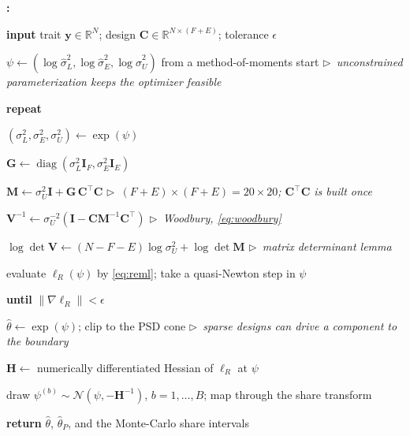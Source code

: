 \documentclass{ieeeaccess}
\theoremstyle{definition}
\theoremstyle{plain}
\newcounter{algstep}
\newenvironment{algsteps}{%
  \footnotesize
  \setcounter{algstep}{0}%
  \begin{list}{\textbf{\thealgstep:}}{%
    \usecounter{algstep}%
    \setlength{\labelwidth}{14pt}%
    \setlength{\labelsep}{4pt}%
    \setlength{\leftmargin}{20pt}%
    \setlength{\rightmargin}{0pt}%
    \setlength{\itemsep}{1pt}%
    \setlength{\parsep}{0pt}%
    \setlength{\topsep}{3pt}%
  }%
}{\end{list}}
\newcommand{\algind}[1]{\hspace*{#1.1em}}
\newcommand{\algkw}[1]{\textbf{#1}}
\newcommand{\algcomment}[1]{\textit{$\triangleright$~#1}}
\begin{document}
\begin{algorithm}[t]
\caption{REML fit via Woodbury with log-variance reparameterization}
\label{alg:reml}
\begin{algsteps}
\item \algkw{input} trait $\mathbf{y}\in\mathbb{R}^{N}$; design
  $\mathbf{C}\in\mathbb{R}^{N\times(F+E)}$; tolerance $\epsilon$
\item $\psi \leftarrow (\log\hat\sigma^{2}_{L}, \log\hat\sigma^{2}_{E},
  \log\hat\sigma^{2}_{U})$ from a method-of-moments start
  \algcomment{unconstrained parameterization keeps the optimizer feasible}
\item \algkw{repeat}
\item \algind{1} $(\sigma^{2}_{L},\sigma^{2}_{E},\sigma^{2}_{U}) \leftarrow
  \exp(\psi)$
\item \algind{1} $\mathbf{G} \leftarrow
  \operatorname{diag}(\sigma^{2}_{L}\mathbf{I}_{F},
  \sigma^{2}_{E}\mathbf{I}_{E})$
\item \algind{1} $\mathbf{M} \leftarrow \sigma^{2}_{U}\mathbf{I} +
  \mathbf{G}\,\mathbf{C}^{\top}\mathbf{C}$
  \algcomment{$(F{+}E)\times(F{+}E) = 20\times20$; $\mathbf{C}^{\top}\mathbf{C}$
  is built once}
\item \algind{1} $\mathbf{V}^{-1} \leftarrow
  \sigma_{U}^{-2}(\mathbf{I}-\mathbf{C}\mathbf{M}^{-1}\mathbf{C}^{\top})$
  \algcomment{Woodbury, \eqref{eq:woodbury}}
\item \algind{1} $\log\det\mathbf{V} \leftarrow (N-F-E)\log\sigma^{2}_{U} +
  \log\det\mathbf{M}$ \algcomment{matrix determinant lemma}
\item \algind{1} evaluate $\ell_{R}(\psi)$ by \eqref{eq:reml}; take a
  quasi-Newton step in $\psi$
\item \algkw{until} $\lVert\nabla\ell_{R}\rVert < \epsilon$
\item $\hat\theta \leftarrow \exp(\psi)$; clip to the PSD cone
  \algcomment{sparse designs can drive a component to the boundary}
\item $\mathbf{H} \leftarrow$ numerically differentiated Hessian of
  $\ell_{R}$ at $\psi$
\item draw $\psi^{(b)} \sim \mathcal{N}(\psi, -\mathbf{H}^{-1})$,
  $b=1,\dots,B$; map through the share transform
\item \algkw{return} $\hat\theta$, $\hat\theta_{P}$, and the Monte-Carlo
  share intervals
\end{algsteps}
\end{algorithm}
\end{document}
